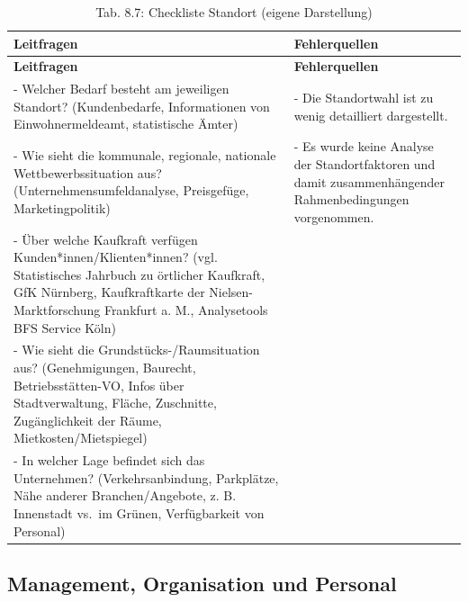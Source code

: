 \documentclass[
  letterpaper,
]{book}
\begin{document}
\begin{longtable}[]{@{}
  >{\raggedright\arraybackslash}p{}
  >{\raggedright\arraybackslash}p{}@{}}
\caption{Tab. 8.7: Checkliste Standort (eigene
Darstellung)}\tabularnewline
\toprule\noalign{}
\begin{minipage}[b]{\linewidth}\raggedright
\textbf{Leitfragen}
\end{minipage} & \begin{minipage}[b]{\linewidth}\raggedright
\textbf{Fehlerquellen}
\end{minipage} \\
\midrule\noalign{}
\endfirsthead
\toprule\noalign{}
\begin{minipage}[b]{\linewidth}\raggedright
\textbf{Leitfragen}
\end{minipage} & \begin{minipage}[b]{\linewidth}\raggedright
\textbf{Fehlerquellen}
\end{minipage} \\
\midrule\noalign{}
\endhead
\bottomrule\noalign{}
\endlastfoot
- Welcher Bedarf besteht am jeweiligen Standort? (Kundenbedarfe,
Informationen von Einwohnermeldeamt, statistische Ämter) & - Die
Standortwahl ist zu wenig detailliert dargestellt. \\
- Wie sieht die kommunale, regionale, nationale Wettbewerbssituation
aus? (Unternehmensumfeldanalyse, Preisgefüge, Marketingpolitik) & - Es
wurde keine Analyse der Standortfaktoren und damit zusammenhängender
Rahmenbedingungen vorgenommen. \\
- Über welche Kaufkraft verfügen Kunden*innen/Klienten*innen? (vgl.
Statistisches Jahrbuch zu örtlicher Kaufkraft, GfK Nürnberg,
Kaufkraftkarte der Nielsen-Marktforschung Frankfurt a. M., Analysetools
BFS Service Köln) & \\
- Wie sieht die Grundstücks-/Raumsituation aus? (Genehmigungen,
Baurecht, Betriebsstätten-VO, Infos über Stadtverwaltung, Fläche,
Zuschnitte, Zugänglichkeit der Räume, Mietkosten/Mietspiegel) & \\
- In welcher Lage befindet sich das Unternehmen? (Verkehrsanbindung,
Parkplätze, Nähe anderer Branchen/Angebote, z. B. Innenstadt vs.~im
Grünen, Verfügbarkeit von Personal) & \\
\end{longtable}

\subsection{Management, Organisation und
Personal}\label{management-organisation-personal}
\end{document}
